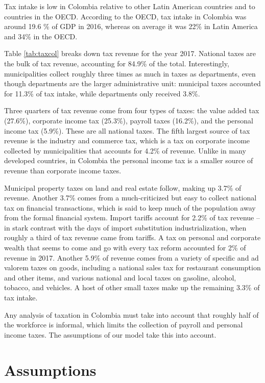 \documentclass[12pt]{article}
\begin{document}
Tax intake is low in Colombia
relative to other Latin American countries and to countries in the OECD.
According to the OECD,
tax intake in Colombia was around 19.6 \% of GDP in 2016,
whereas on average it was
22\% in Latin America and
34\% in the OECD.
\iffalse
    [[reference]]
\fi

Table \ref{tab:taxcol} breaks down tax revenue for the year 2017.
National taxes are the bulk of tax revenue,
accounting for 84.9\% of the total.
Interestingly, municipalities collect roughly three times as much in taxes as departments,
even though departments are the larger administrative unit:
municipal taxes accounted for 11.3\% of tax intake,
while departments only received 3.8\%.

Three quarters of tax revenue come from four types of taxes:
the value added tax (27.6\%),
corporate income tax (25.3\%),
payroll taxes (16.2\%),
and the personal income tax (5.9\%).
These are all national taxes.
The fifth largest source of tax revenue is the industry and commerce tax,
which is a tax on corporate income collected by municipalities
that accounts for 4.2\% of revenue.
Unlike in many developed countries, in Colombia
the personal income tax is a smaller source of revenue than corporate income taxes.

Municipal property taxes on land and real estate follow,
making up 3.7\% of revenue.
Another 3.7\% comes from a much-criticized but easy to collect national tax on financial transactions,
which is said to keep much of the population away from the formal financial system.
Import tariffs account for 2.2\% of tax revenue
-- in stark contrast with the days of import substitution industrialization,
when roughly a third of tax revenue came from tariffs.
A tax on personal and corporate wealth
that seems to come and go with every tax reform
accounted for 2\% of revenue in 2017.
Another 5.9\% of revenue comes from a variety of specific and ad valorem taxes on goods,
including a national sales tax for restaurant consumption and other items,
and various national and local taxes on
gasoline, alcohol, tobacco, and vehicles.
A host of other small taxes make up the remaining 3.3\% of tax intake.

Any analysis of taxation in Colombia must take into account that
roughly half of the workforce is informal,
which limits the collection of payroll and personal income taxes.
The assumptions of our model take this into account.

\section{Assumptions}
\end{document}
